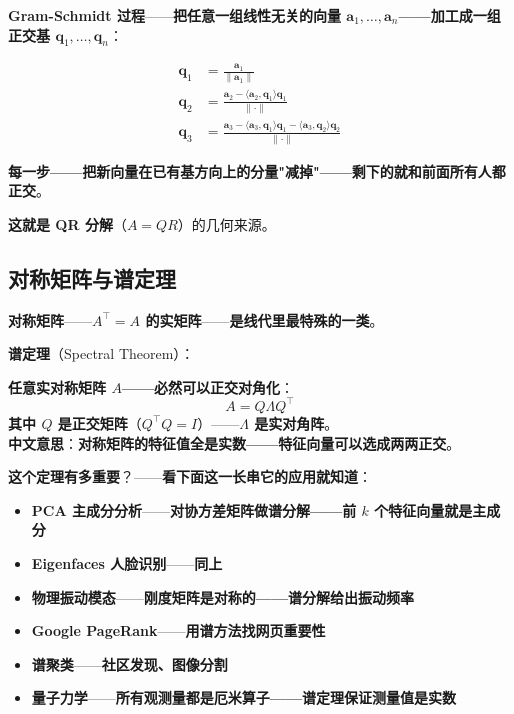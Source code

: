 \textbf{Gram-Schmidt 过程}——\textbf{把任意一组线性无关的向量 $\bm{a}_1, \dots, \bm{a}_n$——加工成一组正交基 $\bm{q}_1, \dots, \bm{q}_n$}：

\begin{align*}
\bm{q}_1 &= \frac{\bm{a}_1}{\|\bm{a}_1\|} \\
\bm{q}_2 &= \frac{\bm{a}_2 - \langle \bm{a}_2, \bm{q}_1 \rangle \bm{q}_1}{\|\cdot\|} \\
\bm{q}_3 &= \frac{\bm{a}_3 - \langle \bm{a}_3, \bm{q}_1 \rangle \bm{q}_1 - \langle \bm{a}_3, \bm{q}_2 \rangle \bm{q}_2}{\|\cdot\|}
\end{align*}

\textbf{每一步——把新向量在已有基方向上的分量"减掉"——剩下的就和前面所有人都正交}。

\textbf{这就是 QR 分解}（$A = QR$）的几何来源。

\subsection{对称矩阵与谱定理}

\textbf{对称矩阵}——\textbf{$A^\top = A$ 的实矩阵}——\textbf{是线代里最特殊的一类}。

\textbf{谱定理}（Spectral Theorem）：

\begin{tcolorbox}[essbox={谱定理 / Spectral Theorem}]
\textbf{任意实对称矩阵 $A$——必然可以正交对角化}：
\[
A = Q \Lambda Q^\top
\]
\textbf{其中 $Q$ 是正交矩阵}（$Q^\top Q = I$）——\textbf{$\Lambda$ 是实对角阵}。\\[4pt]
\textbf{中文意思}：\textbf{对称矩阵的特征值全是实数——特征向量可以选成两两正交}。
\end{tcolorbox}

\textbf{这个定理有多重要}？——\textbf{看下面这一长串它的应用就知道}：

\begin{itemize}
\item \textbf{PCA 主成分分析}——\textbf{对协方差矩阵做谱分解——前 $k$ 个特征向量就是主成分}
\item \textbf{Eigenfaces 人脸识别}——\textbf{同上}
\item \textbf{物理振动模态}——\textbf{刚度矩阵是对称的——谱分解给出振动频率}
\item \textbf{Google PageRank}——\textbf{用谱方法找网页重要性}
\item \textbf{谱聚类}——\textbf{社区发现、图像分割}
\item \textbf{量子力学}——\textbf{所有观测量都是厄米算子——谱定理保证测量值是实数}
\end{itemize}

